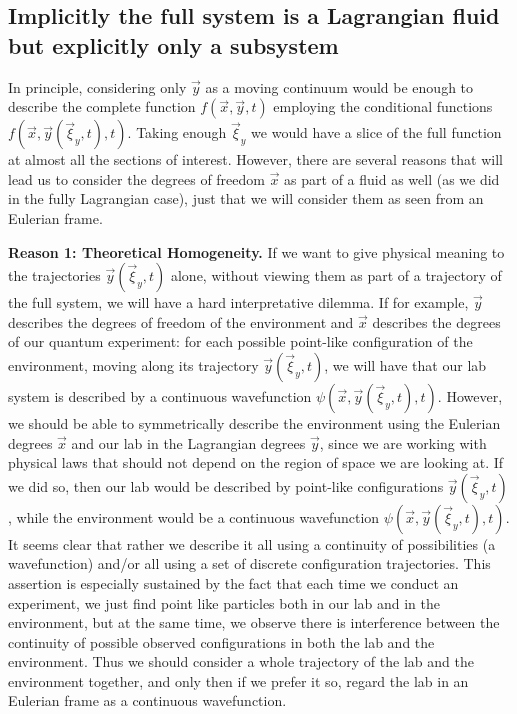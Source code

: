 \documentclass[11pt, a4paper]{article} %
\begin{document}
\subsection*{Implicitly the full system is a Lagrangian fluid but explicitly only a subsystem\vspace{-0.2cm}}
In principle, considering only $\vec{y}$ as a moving continuum would be enough to describe the complete function $f(\vec{x},\vec{y},t)$ employing the conditional functions $f(\vec{x},\vec{y}(\vec{\xi}_y,t),t)$. Taking enough $\vec{\xi}_y$ we would have a slice of the full function at almost all the sections of interest. However, there are several reasons that will lead us to consider the degrees of freedom $\vec{x}$ as part of a fluid as well (as we did in the fully Lagrangian case), just that we will consider them as seen from an Eulerian frame.

{\bf Reason 1: Theoretical Homogeneity.} If we want to give physical meaning to the trajectories $\vec{y}(\vec{\xi}_y,t)$ alone, without viewing them as part of a trajectory of the full system, we will have a hard interpretative dilemma. If for example, $\vec{y}$ describes the degrees of freedom of the environment and $\vec{x}$ describes the degrees of our quantum experiment: for each possible point-like configuration of the environment, moving along its trajectory $\vec{y}(\vec{\xi}_y,t)$, we will have that our lab system is described by a continuous wavefunction $\psi(\vec{x},\vec{y}(\vec{\xi}_y,t),t)$. However, we should be able to symmetrically describe the environment using the Eulerian degrees $\vec{x}$ and our lab in the Lagrangian degrees $\vec{y}$, since we are working with physical laws that should not depend on the region of space we are looking at. If we did so, then our lab would be described by point-like configurations $\vec{y}(\vec{\xi}_y,t)$, while the environment would be a continuous wavefunction $\psi(\vec{x},\vec{y}(\vec{\xi}_y,t),t)$. It seems clear that rather we describe it all using a continuity of possibilities (a wavefunction) and/or all using a set of discrete configuration trajectories. This assertion is especially sustained by the fact that each time we conduct an experiment, we just find point like particles both in our lab and in the environment, but at the same time, we observe there is interference between the continuity of possible observed configurations in both the lab and the environment. Thus we should consider a whole trajectory of the lab and the environment together, and only then if we prefer it so, regard the lab in an Eulerian frame as a continuous wavefunction.
\end{document}
